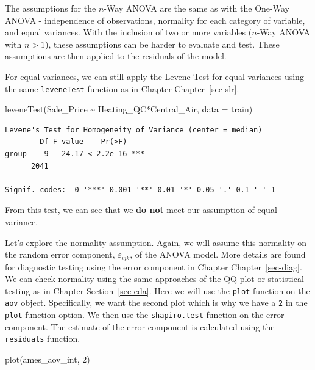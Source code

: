 \documentclass[
  letterpaper,
  DIV=11,
  numbers=noendperiod]{scrreprt}
\newenvironment{Shaded}{\begin{snugshade}}{\end{snugshade}}
\newcommand{\AttributeTok}[1]{\textcolor[rgb]{0.40,0.45,0.13}{#1}}
\newcommand{\DecValTok}[1]{\textcolor[rgb]{0.68,0.00,0.00}{#1}}
\newcommand{\FunctionTok}[1]{\textcolor[rgb]{0.28,0.35,0.67}{#1}}
\newcommand{\NormalTok}[1]{\textcolor[rgb]{0.00,0.23,0.31}{#1}}
\newcommand{\SpecialCharTok}[1]{\textcolor[rgb]{0.37,0.37,0.37}{#1}}
\begin{document}
The assumptions for the \(n\)-Way ANOVA are the same as with the One-Way
ANOVA - independence of observations, normality for each category of
variable, and equal variances. With the inclusion of two or more
variables (\(n\)-Way ANOVA with \(n > 1\)), these assumptions can be
harder to evaluate and test. These assumptions are then applied to the
residuals of the model.

For equal variances, we can still apply the Levene Test for equal
variances using the same \texttt{leveneTest} function as in Chapter
Chapter~\ref{sec-slr}.

\begin{Shaded}
\begin{Highlighting}[]
\FunctionTok{leveneTest}\NormalTok{(Sale\_Price }\SpecialCharTok{\textasciitilde{}}\NormalTok{ Heating\_QC}\SpecialCharTok{*}\NormalTok{Central\_Air, }\AttributeTok{data =}\NormalTok{ train)}
\end{Highlighting}
\end{Shaded}

\begin{verbatim}
Levene's Test for Homogeneity of Variance (center = median)
        Df F value    Pr(>F)    
group    9   24.17 < 2.2e-16 ***
      2041                      
---
Signif. codes:  0 '***' 0.001 '**' 0.01 '*' 0.05 '.' 0.1 ' ' 1
\end{verbatim}

From this test, we can see that we \textbf{do not} meet our assumption
of equal variance.

Let's explore the normality assumption. Again, we will assume this
normality on the random error component, \(\varepsilon_{ijk}\), of the
ANOVA model. More details are found for diagnostic testing using the
error component in Chapter Chapter~\ref{sec-diag}. We can check
normality using the same approaches of the QQ-plot or statistical
testing as in Chapter Section~\ref{sec-eda}. Here we will use the
\texttt{plot} function on the \texttt{aov} object. Specifically, we want
the second plot which is why we have a \texttt{2} in the \texttt{plot}
function option. We then use the \texttt{shapiro.test} function on the
error component. The estimate of the error component is calculated using
the \texttt{residuals} function.

\begin{Shaded}
\begin{Highlighting}[]
\FunctionTok{plot}\NormalTok{(ames\_aov\_int, }\DecValTok{2}\NormalTok{)}
\end{Highlighting}
\end{Shaded}
\end{document}
